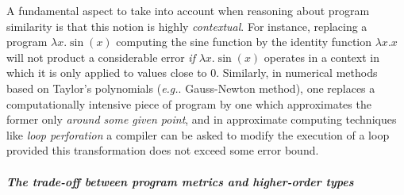   

 
  
% 
%  
%
%
% 
% 
%  
   
 A fundamental aspect to take into account when reasoning about program similarity is that this notion is highly \emph{contextual}. For instance, replacing a program $\lambda x.\sin(x)$ computing the sine function  by the identity function $\lambda x.x$ 
will not product a considerable error \emph{if} $\lambda x.\sin(x)$
operates in a context in which it is only applied to values close to $0$.
Similarly, in numerical methods based on Taylor's polynomials (\textit{e.g.}. Gauss-Newton method), one replaces a 
 computationally intensive piece of program by one which approximates the former only \emph{around some given point}, and in {approximate computing} techniques like \emph{loop perforation} \cite{loopperf} a compiler can be asked to modify the execution of a loop provided this transformation does not exceed some error bound.
 
\subparagraph*{The trade-off between program metrics and higher-order types}



